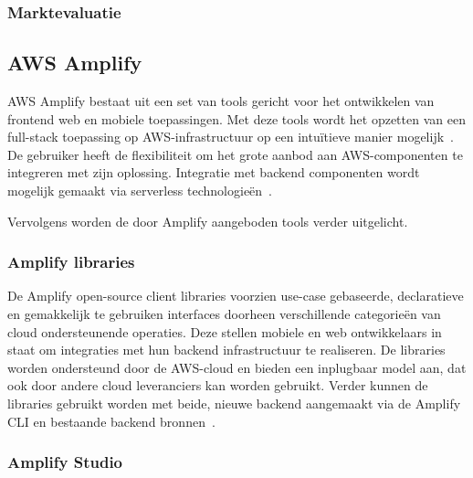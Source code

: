 \subsubsection{Marktevaluatie}



\subsection{AWS Amplify}
\label{sec:service-amplify}

AWS Amplify bestaat uit een set van tools gericht voor het ontwikkelen van frontend web en mobiele toepassingen.
Met deze tools wordt het opzetten van een full-stack toepassing op AWS-infrastructuur op een intuïtieve manier mogelijk~\autocite{AWSCopilotOverview}.
De gebruiker heeft de flexibiliteit om het grote aanbod aan AWS-componenten te integreren met zijn oplossing.
Integratie met backend componenten wordt mogelijk gemaakt via serverless technologieën~\autocite{Kandaswamy2022}.

Vervolgens worden de door Amplify aangeboden tools verder uitgelicht.

\subsubsection{Amplify libraries}

De Amplify open-source client libraries voorzien use-case gebaseerde, declaratieve en gemakkelijk te gebruiken interfaces
doorheen verschillende categorieën van cloud ondersteunende operaties.
Deze stellen mobiele en web ontwikkelaars in staat om integraties met hun backend infrastructuur te realiseren.
De libraries worden ondersteund door de AWS-cloud en bieden een inplugbaar model aan, dat ook door andere cloud leveranciers kan worden gebruikt.
Verder kunnen de libraries gebruikt worden met beide, nieuwe backend aangemaakt via de Amplify CLI en bestaande backend bronnen~\autocite{AWSAmplifyDocs}.

\subsubsection{Amplify Studio}

